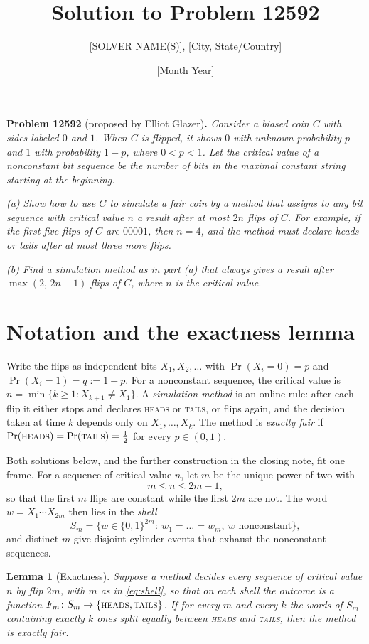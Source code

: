 \documentclass[11pt]{article}
\title{Solution to Problem 12592}
\author{[SOLVER NAME(S)], [City, State/Country]}
\date{[Month Year]}
\newtheorem{lemma}[theorem]{Lemma}
\theoremstyle{remark}
\newcommand{\head}{\textnormal{\textsc{heads}}}
\newcommand{\tail}{\textnormal{\textsc{tails}}}
\begin{document}
\maketitle

\noindent\textbf{Problem 12592} (proposed by Elliot Glazer)\textbf{.}
\emph{Consider a biased coin $C$ with sides labeled $0$ and $1$. When $C$ is
flipped, it shows $0$ with unknown probability $p$ and $1$ with probability
$1-p$, where $0<p<1$. Let the \emph{critical value} of a nonconstant bit
sequence be the number of bits in the maximal constant string starting at the
beginning.}

\emph{(a) Show how to use $C$ to simulate a fair coin by a method that assigns
to any bit sequence with critical value $n$ a result after at most $2n$ flips
of $C$. For example, if the first five flips of $C$ are $00001$, then $n=4$,
and the method must declare heads or tails after at most three more flips.}

\emph{(b) Find a simulation method as in part (a) that always gives a result
after $\max(2,\,2n-1)$ flips of $C$, where $n$ is the critical value.}

\section*{Notation and the exactness lemma}

Write the flips as independent bits $X_1,X_2,\dots$ with $\Pr(X_i=0)=p$ and
$\Pr(X_i=1)=q:=1-p$. For a nonconstant sequence, the critical value is
$n=\min\{k\ge 1: X_{k+1}\ne X_1\}$. A \emph{simulation method} is an online
rule: after each flip it either stops and declares \head{} or \tail{}, or
flips again, and the decision taken at time $k$ depends only on
$X_1,\dots,X_k$. The method is \emph{exactly fair} if
$\Pr(\head)=\Pr(\tail)=\tfrac12$ for every $p\in(0,1)$.

Both solutions below, and the further construction in the closing note, fit
one frame. For a sequence of critical value $n$, let $m$ be the unique power
of two with
\begin{equation}\label{eq:shell}
m\le n\le 2m-1 ,
\end{equation}
so that the first $m$ flips are constant while the first $2m$ are not. The
word $w=X_1\cdots X_{2m}$ then lies in the \emph{shell}
\[
S_m=\{w\in\{0,1\}^{2m}:\ w_1=\dots=w_m,\ w \text{ nonconstant}\},
\]
and distinct $m$ give disjoint cylinder events that exhaust the nonconstant
sequences.

\begin{lemma}[Exactness]\label{lem:exact}
Suppose a method decides every sequence of critical value $n$ by flip $2m$,
with $m$ as in \eqref{eq:shell}, so that on each shell the outcome is a
function $F_m\colon S_m\to\{\head,\tail\}$. If for every $m$ and every $k$
the words of $S_m$ containing exactly $k$ ones split equally between \head{}
and \tail{}, then the method is exactly fair.
\end{lemma}
\end{document}
